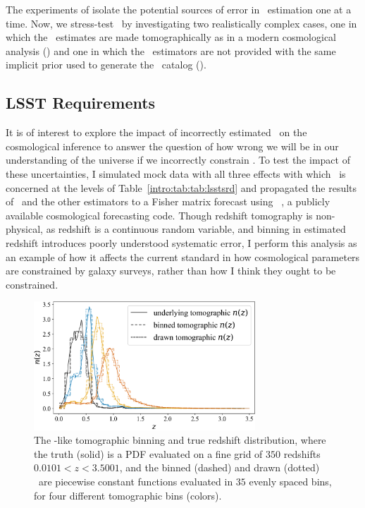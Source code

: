 The experiments of  isolate the potential sources of error in \nz\ estimation one at a time.
Now, we stress-test \Chippr\ by investigating two realistically complex cases, one in which the \nz\ estimates are made tomographically as in a modern cosmological analysis () and one in which the \nz\ estimators are not provided with the same implicit prior used to generate the \pzpdf\ catalog ().

\subsection{LSST Requirements}

It is of interest to explore the impact of incorrectly estimated \nz\ on the cosmological inference to answer the question of how wrong we will be in our understanding of the universe if we incorrectly constrain \nz.
To test the impact of these uncertainties, I simulated mock data with all three effects with which \lsst\ is concerned at the levels of Table~\ref{intro:tab:tab:lsstsrd} and propagated the results of \Chippr\ and the other estimators to a Fisher matrix forecast using \cosmolike\ \citep{krause_cosmolike_2017}, a publicly available cosmological forecasting code.
Though redshift tomography is non-physical, as redshift is a continuous random variable, and binning in estimated redshift introduces poorly understood systematic error, I perform this analysis as an example of how it affects the current standard in how cosmological parameters are constrained by galaxy surveys, rather than how I think they ought to be constrained.

\begin{figure}
	\begin{center}
		\includegraphics[width=0.74\textwidth]{figures/chippr/cosmolike_inputs.png}
		\caption{
			The \lsst-like tomographic binning and true redshift distribution, where the truth (solid) is a PDF evaluated on a fine grid of $350$ redshifts $0.0101 < z < 3.5001$, and the binned (dashed) and drawn (dotted) \nz\ are piecewise constant functions evaluated in $35$ evenly spaced bins, for four different tomographic bins (colors).
		}
	\end{center}
\end{figure}


